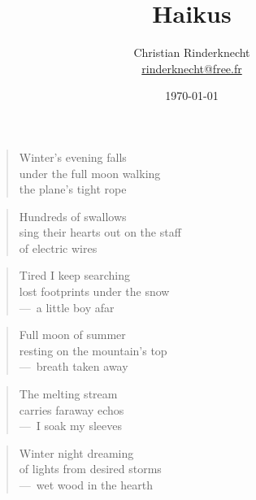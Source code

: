 \documentclass[a4paper,12pt]{article}
\title{Haikus}
\author{Christian Rinderknecht\\
{\small \url{rinderknecht@free.fr}}}
\date{\today}
\begin{document}
\begin{verse}
  Winter's evening falls \\
  under the full moon walking \\
  the plane's tight rope
\end{verse}

\begin{verse}
  Hundreds of swallows \\
  sing their hearts out on the staff \\
  of electric wires
\end{verse}

\begin{verse}
  Tired I keep searching \\
  lost footprints under the snow \\
  ---~a little boy afar
\end{verse}

\begin{verse}
  Full moon of summer \\
  resting on the mountain's top \\
  ---~breath taken away
\end{verse}

\begin{verse}
  The melting stream \\
  carries faraway echos \\
  ---~I soak my sleeves
\end{verse}

\begin{verse}
  Winter night dreaming \\
  of lights from desired storms \\
  ---~wet wood in the hearth
\end{verse}
\end{document}
